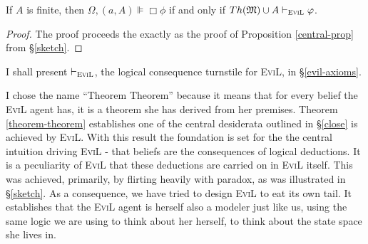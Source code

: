 \begin{theorem}\label{theorem-theorem}
  If $A$ is finite, then $\Omega, (a,A) \VDash \Box \phi$ if and only if $Th(\Omega) \cup A \vdash_{\text{\textsc{EviL}}} \phi$.
\end{theorem}
\begin{proof}
  The proof proceeds the exactly as the proof of Proposition
  \ref{central-prop} from \S\ref{sketch}.
\end{proof}

I shall present $\vdash_{\text{\textsc{EviL}}}$, the logical consequence turnstile for \textsc{EviL}, in \S\ref{evil-axioms}.

I chose the name ``Theorem Theorem'' because it means that for every
belief the \textsc{EviL} agent has, it is a theorem she has derived
from her premises. Theorem \ref{theorem-theorem} establishes one of
the central desiderata outlined in \S\ref{close} is achieved by
\textsc{EviL}.  With this result the foundation is set for the the
central intuition driving \textsc{EviL} - that beliefs are the
consequences of logical deductions.  It is a peculiarity of
\textsc{EviL} that these deductions are carried on in \textsc{EviL}
itself.  This was achieved, primarily, by flirting heavily with
paradox, as was illustrated in \S\ref{sketch}.  
As a consequence, we have tried to design \textsc{EviL}
to eat its own tail. 
It establishes that the \textsc{EviL} agent is
herself also a modeler just like us, using the same logic we are using
to think about her herself, to think about the state space she lives
in.

